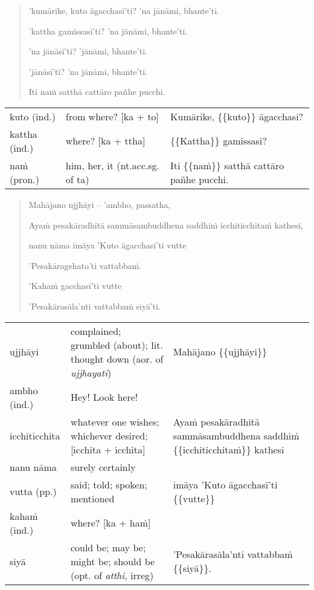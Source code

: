 \documentclass[11pt,oneside]{memoir}
\begin{document}
\enlargethispage{\baselineskip}

\clearpage

\begin{quote}
'kumārike, kuto āgacchasī'ti? 'na jānāmi, bhante'ti.

'kattha gamissasī'ti? 'na jānāmi, bhante'ti.

'na jānāsī'ti? 'jānāmi, bhante'ti.

'jānāsī'ti? 'na jānāmi, bhante'ti.

Iti naṁ satthā cattāro pañhe pucchi.
\end{quote}

\begin{longtable}{L{\colOne} L{\colTwo} H}
kuto (ind.) & from where? [ka + to] & Kumārike, \{\{kuto\}\} āgacchasi?\\[0pt]
kattha (ind.) & where? [ka + ttha] & \{\{Kattha\}\} gamissasi?\\[0pt]
naṁ (pron.) & him, her, it (nt.acc.sg. of ta) & Iti \{\{naṁ\}\} satthā cattāro pañhe pucchi.\\[0pt]
\end{longtable}


\clearpage

\begin{quote}
Mahājano ujjhāyi -- 'ambho, passatha,

Ayaṁ pesakāradhītā sammāsambuddhena saddhiṁ icchiticchitaṁ kathesi,

nanu nāma imāya 'Kuto āgacchasī'ti vutte

'Pesakāragehato'ti vattabbaṁ.

'Kahaṁ gacchasī'ti vutte

'Pesakārasāla'nti vattabbaṁ siyā'ti.
\end{quote}

\begin{longtable}{L{\colOne} L{\colTwo} H}
ujjhāyi & complained; grumbled (about); lit. thought down (aor. of \emph{ujjhayati}) & Mahājano \{\{ujjhāyi\}\}\\[0pt]
ambho (ind.) & Hey! Look here! & \\[0pt]
icchiticchita & whatever one wishes; whichever desired; [icchita + icchita] & Ayaṁ pesakāradhītā sammāsambuddhena saddhiṁ \{\{icchiticchitaṁ\}\} kathesi\\[0pt]
nanu nāma & surely certainly & \\[0pt]
vutta (pp.) & said; told; spoken; mentioned & imāya 'Kuto āgacchasī'ti \{\{vutte\}\}\\[0pt]
kahaṁ (ind.) & where? [ka + haṁ] & \\[0pt]
siyā & could be; may be; might be; should be (opt. of \emph{atthi}, irreg) & 'Pesakārasāla'nti vattabbaṁ \{\{siyā\}\}.\\[0pt]
\end{longtable}
\end{document}
